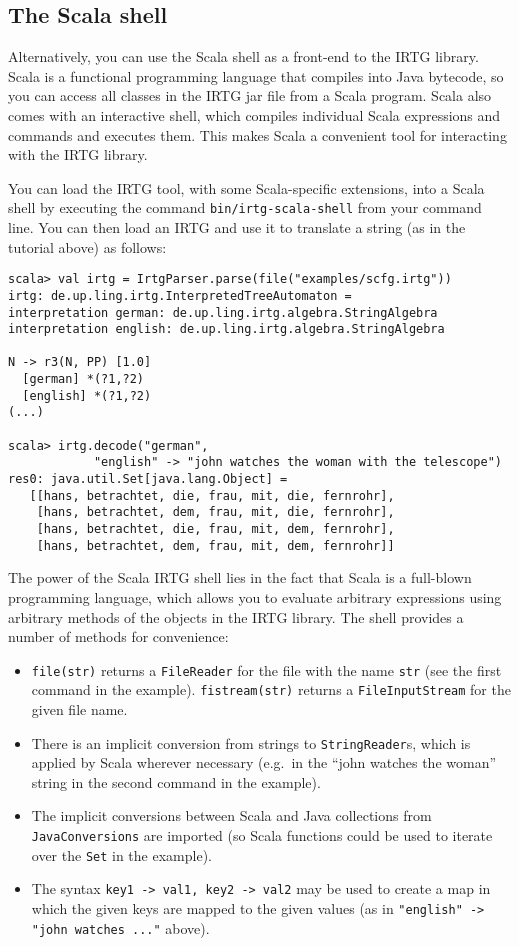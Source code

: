 \documentclass[11pt]{article}
\begin{document}
\subsection{The Scala shell}

Alternatively, you can use the Scala shell as a front-end to the IRTG
library. Scala is a functional programming language that compiles into
Java bytecode, so you can access all classes in the IRTG jar file from
a Scala program. Scala also comes with an interactive shell, which
compiles individual Scala expressions and commands and executes
them. This makes Scala a convenient tool for interacting with the IRTG
library.

You can load the IRTG tool, with some Scala-specific extensions, into
a Scala shell by executing the command \verb?bin/irtg-scala-shell?
from your command line.  You can then load an IRTG and use it to
translate a string (as in the tutorial above) as follows:

\begin{verbatim}
scala> val irtg = IrtgParser.parse(file("examples/scfg.irtg"))
irtg: de.up.ling.irtg.InterpretedTreeAutomaton = 
interpretation german: de.up.ling.irtg.algebra.StringAlgebra
interpretation english: de.up.ling.irtg.algebra.StringAlgebra

N -> r3(N, PP) [1.0]
  [german] *(?1,?2)
  [english] *(?1,?2)
(...)

scala> irtg.decode("german", 
            "english" -> "john watches the woman with the telescope")
res0: java.util.Set[java.lang.Object] = 
   [[hans, betrachtet, die, frau, mit, die, fernrohr], 
    [hans, betrachtet, dem, frau, mit, die, fernrohr], 
    [hans, betrachtet, die, frau, mit, dem, fernrohr], 
    [hans, betrachtet, dem, frau, mit, dem, fernrohr]]
\end{verbatim}

The power of the Scala IRTG shell lies in the fact that Scala is a
full-blown programming language, which allows you to evaluate
arbitrary expressions using arbitrary methods of the objects in the
IRTG library. The shell provides a number of methods for convenience:
\begin{itemize}
\item \verb?file(str)? returns a \verb?FileReader? for the file with
  the name \verb?str? (see the first command in the
  example). \verb?fistream(str)? returns a \verb?FileInputStream? for
  the given file name.
\item There is an implicit conversion from strings to
  \verb?StringReader?s, which is applied by Scala wherever necessary
  (e.g.\ in the ``john watches the woman'' string in the second
  command in the example).
\item The implicit conversions between Scala and Java collections from
  \verb?JavaConversions? are imported (so Scala functions could be
  used to iterate over the \verb?Set? in the example).
\item The syntax \verb?key1 -> val1, key2 -> val2? may be used to
  create a map in which the given keys are mapped to the given
  values (as in \verb?"english" -> "john watches ..."? above).
\end{itemize}
\end{document}

